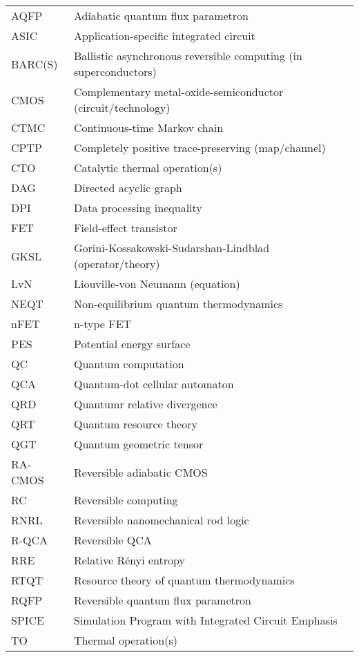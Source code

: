 \documentclass[preprints,article,accept,moreauthors,pdftex]{Definitions/mdpi}
\begin{document}
\begin{paracol}{2}
{\noindent 
\begin{tabular}{@{}ll}
AQFP & Adiabatic quantum flux parametron \\
ASIC & Application-specific integrated circuit \\
BARC(S) & Ballistic asynchronous reversible computing (in superconductors) \\
CMOS & Complementary metal-oxide-semiconductor (circuit/technology) \\
CTMC & Continuous-time Markov chain \\
CPTP & Completely positive trace-preserving (map/channel) \\
CTO & Catalytic thermal operation(s) \\
DAG & Directed acyclic graph \\
DPI & Data processing inequality \\
FET & Field-effect transistor \\
GKSL & Gorini-Kossakowski-Sudarshan-Lindblad (operator/theory) \\
LvN & Liouville-von Neumann (equation)\\
NEQT & Non-equilibrium quantum thermodynamics\\
nFET & n-type FET \\
PES & Potential energy surface \\
QC & Quantum computation \\
QCA & Quantum-dot cellular automaton \\
QRD & Quantumr relative divergence \\
QRT & Quantum resource theory \\
QGT & Quantum geometric tensor \\
RA-CMOS & Reversible adiabatic CMOS\\
RC & Reversible computing\\
RNRL & Reversible nanomechanical rod logic \\
R-QCA & Reversible QCA \\
RRE & Relative Rényi entropy \\
RTQT & Resource theory of quantum thermodynamics \\
RQFP & Reversible quantum flux parametron \\
SPICE & Simulation Program with Integrated Circuit Emphasis \\
TO & Thermal operation(s)
\end{tabular}}


\end{paracol}
\end{document}
